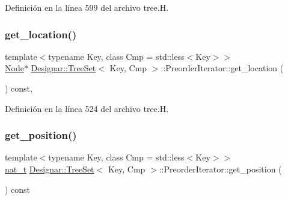 Definición en la línea 599 del archivo tree.\+H.

\mbox{\label{class_designar_1_1_tree_set_1_1_preorder_iterator_a869f68f8626743605781bb18cfd13bbb}} 
\subsubsection{\texorpdfstring{get\+\_\+location()}{get\_location()}}
{\footnotesize\ttfamily template$<$typename Key, class Cmp = std\+::less$<$\+Key$>$$>$ \\
\hyperlink{class_designar_1_1_tree_set_a7409a9c1545c0e9e2fd6b84120713c99}{Node}$\ast$ \hyperlink{class_designar_1_1_tree_set}{Designar\+::\+Tree\+Set}$<$ Key, Cmp $>$\+::Preorder\+Iterator\+::get\+\_\+location (\begin{DoxyParamCaption}{ }\end{DoxyParamCaption}) const\hspace{0.3cm}{\ttfamily [inline]}, {\ttfamily [protected]}}



Definición en la línea 524 del archivo tree.\+H.

\mbox{\label{class_designar_1_1_tree_set_1_1_preorder_iterator_a76a9499f0414651a4399f57f7568b168}} 
\subsubsection{\texorpdfstring{get\+\_\+position()}{get\_position()}}
{\footnotesize\ttfamily template$<$typename Key, class Cmp = std\+::less$<$\+Key$>$$>$ \\
\hyperlink{namespace_designar_aa72662848b9f4815e7bf31a7cf3e33d1}{nat\+\_\+t} \hyperlink{class_designar_1_1_tree_set}{Designar\+::\+Tree\+Set}$<$ Key, Cmp $>$\+::Preorder\+Iterator\+::get\+\_\+position (\begin{DoxyParamCaption}{ }\end{DoxyParamCaption}) const\hspace{0.3cm}{\ttfamily [inline]}}



